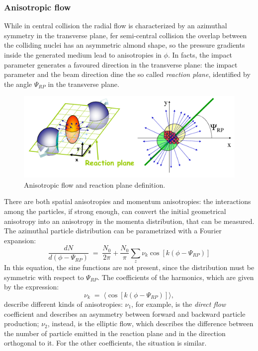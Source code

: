 \subsubsection{Anisotropic flow}
While in central collision the radial flow is characterized by an azimuthal symmetry in the transverse plane, fer semi-central collision the overlap between the colliding nuclei has an asymmetric almond shape, so the pressure gradients inside the generated medium lead to anisotropies in $\phi$. In facts, the impact parameter generates a favoured direction in the transverse plane: the impact parameter and the beam direction dine the so called \textit{reaction plane}, identified by the angle $\Psi_{RP}$ in the transverse plane.\\
%
\begin{figure}
  \centering
  \includegraphics[scale=0.3]{figures/flow.png}
  \caption{Anisotropic flow and reaction plane definition.}
  \label{fig:flow}
\end{figure}
%
There are both spatial anisotropies and momentum anisotropies: the interactions among the particles, if strong enough, can convert the initial geometrical anisotropy into an anisotropy in the momenta distribution, that can be measured.\\
The azimuthal particle distribution can be parametrized with a Fourier expansion:
\begin{equation}
 \frac{dN}{d(\phi-\Psi_{RP})}\;=\;\frac{N_{0}}{2\pi} + \frac{N_{0}}{\pi}\sum_{z} \nu_{k}\cos[k(\phi-\Psi_{RP})]
\end{equation}
In this equation, the sine functions are not present, since the distribution must be symmetric with respect to $\Psi_{RP}$.
The coefficients of the harmonics, which are given by the expression:
\begin{equation}
 \nu_{k}\;=\;\langle \cos[k(\phi-\Psi_{RP})]\rangle,
\end{equation}
describe different kinds of anisotropies: $\nu_{1}$, for example, is the \textit{direct flow} coefficient and describes an asymmetry between forward and backward particle production; $\nu_{2}$, instead, is the elliptic flow, which describes the difference between the number of particle emitted in the reaction plane and in the direction orthogonal to it. For the other coefficients, the situation is similar.\\
